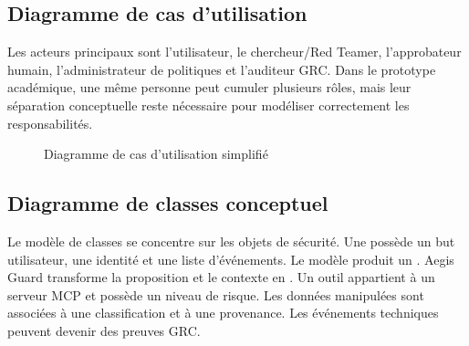 \subsection{Diagramme de cas d'utilisation}

Les acteurs principaux sont l'utilisateur, le chercheur/Red Teamer, l'approbateur humain, l'administrateur de politiques et l'auditeur GRC. Dans le prototype académique, une même personne peut cumuler plusieurs rôles, mais leur séparation conceptuelle reste nécessaire pour modéliser correctement les responsabilités.

\begin{figure}[H]
\centering
{}
\caption{Diagramme de cas d'utilisation simplifié}
\label{fig:usecase}
\end{figure}

\subsection{Diagramme de classes conceptuel}

Le modèle de classes se concentre sur les objets de sécurité. Une  possède un but utilisateur, une identité et une liste d'événements. Le modèle produit un . Aegis Guard transforme la proposition et le contexte en . Un outil appartient à un serveur MCP et possède un niveau de risque. Les données manipulées sont associées à une classification et à une provenance. Les événements techniques peuvent devenir des preuves GRC.

